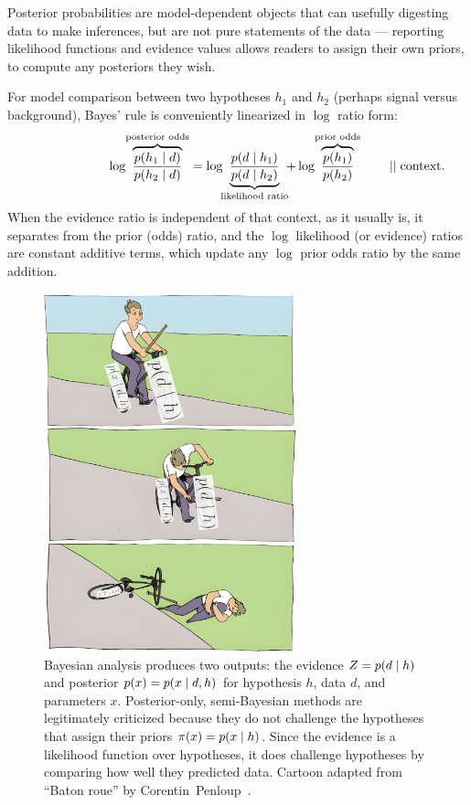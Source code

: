 Posterior probabilities are model-dependent objects that can usefully
digesting data to make inferences, but are not pure statements of the data ---
reporting likelihood functions and evidence values allows readers to assign
their own priors, to compute any posteriors they wish.

For model comparison between two hypotheses $h_1$ and $h_2$
(perhaps signal versus background),
Bayes' rule is conveniently linearized in $\log$ ratio form:
\begin{equation}
\label{eqn:searches_log_odds}
\hphantom{\quad \quad \mid\mid \mathrm{context}}
\log\!
\overbrace{
\frac{\prob{h_1}{d}}{\prob{h_2}{d}}
}^\textrm{posterior odds}
=
\log\!\!
\underbrace{
\frac{\prob{d}{h_1}}{\prob{d}{h_2}}
}_\textrm{likelihood ratio}
\!\!
+
\log\!
\overbrace{
\frac{\probc{h_1}}{\probc{h_2}}
}^\textrm{prior odds}
\quad \quad \mid\mid \mathrm{context}
.
\end{equation}
When the evidence ratio is independent of that context, as it usually is,
it separates from the prior (odds) ratio,
and the $\log$ likelihood (or evidence) ratios are constant additive terms,
which update any $\log$ prior odds ratio by the same addition.

\begin{figure}[tp]
\centering
\includegraphics[width=0.65\textwidth]{figures/searches_baton_roue_bayes.jpg}
\caption[
Bayesian analysis produces two outputs: the evidence and posterior
]{%
Bayesian analysis produces two outputs: the
evidence $Z = p(d \mid h)$ and
posterior $p(x) = p(x \mid d,h)$
for hypothesis $h$, data $d$, and parameters $x$.
Posterior-only, semi-Bayesian methods are legitimately criticized because they
do not challenge the hypotheses that assign their priors
$\pi(x) = p(x \mid h)$.
Since the evidence is a likelihood function over hypotheses, it does challenge
hypotheses by comparing how well they predicted data.
Cartoon adapted from ``Baton roue'' by
Corentin~Penloup~\cite{penloup2011baton}.
}
\label{fig:searches_baton_roue_bayes}
\end{figure}

